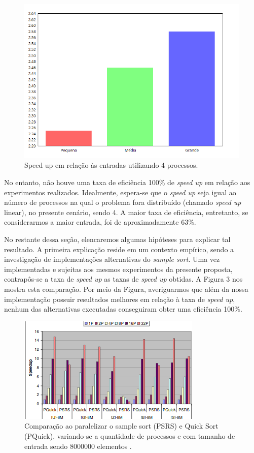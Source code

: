 \documentclass[letterpaper, 10 pt, conference]{ieeeconf}  %
\begin{document}
\begin{figure}[htbp]
      \centering
      \includegraphics[scale=0.35]{four_pro.png}
      \caption{ Speed up em relação às entradas utilizando 4 processos. }
      \label{figurelabel2}
\end{figure}

No entanto, não houve uma taxa de eficiência 100\% de \textit{speed up} em relação aos experimentos realizados. Idealmente, espera-se que o \textit{speed up} seja igual ao número de processos na qual o problema fora distribuído (chamado \textit{speed up} linear), no presente cenário, sendo 4. A maior taxa de eficiência, entretanto, se considerarmos a maior entrada, foi de aproximadamente 63\%. 

No restante dessa seção, elencaremos algumas hipóteses para explicar tal resultado. A primeira explicação reside em um contexto empírico, sendo a investigação de implementações alternativas do \textit{sample sort}. Uma vez implementadas e sujeitas aos mesmos experimentos da presente proposta, contrapôs-se a taxa de \textit{speed up} as taxas de \textit{speed up} obtidas. A Figura 3 nos mostra esta comparação. Por meio da Figura, averiguarmos que além da nossa implementação possuir resultados melhores em relação à taxa de \textit{speed up}, nenhum das alternativas executadas conseguiram obter uma eficiência 100\%. 

\begin{figure}[htbp]
      \centering
      \includegraphics[scale=0.74]{trab_rela.png}
      \caption{Comparação ao paralelizar o sample sort (PSRS) e Quick Sort (PQuick), variando-se a quantidade de processos e com tamanho de entrada sendo 8000000 elementos \cite{c8}. }
      \label{figurelabel3}
\end{figure}
\end{document}

